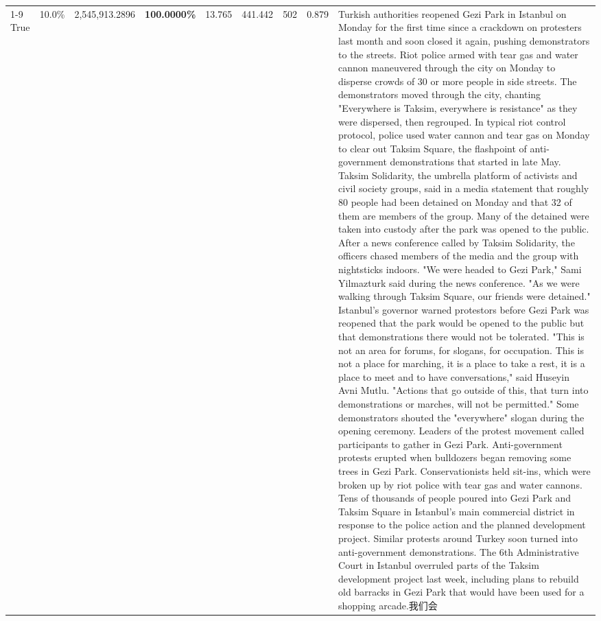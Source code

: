 \begin{table}[H]
\begin{tabular}{lllrlllll}
\cline{1-9}
True & 10.0\% & 2,545,913.2896 & \bfseries \color{red} 100.0000\% & 13.765 & 441.442 & 502 & 0.879 & Turkish authorities reopened Gezi Park in Istanbul on Monday for the first time since a crackdown on protesters last month and soon closed it again, pushing demonstrators to the streets. Riot police armed with tear gas and water cannon maneuvered through the city on Monday to disperse crowds of 30 or more people in side streets. The demonstrators moved through the city, chanting "Everywhere is Taksim, everywhere is resistance" as they were dispersed, then regrouped. In typical riot control protocol, police used water cannon and tear gas on Monday to clear out Taksim Square, the flashpoint of anti-government demonstrations that started in late May. Taksim Solidarity, the umbrella platform of activists and civil society groups, said in a media statement that roughly 80 people had been detained on Monday and that 32 of them are members of the group. Many of the detained were taken into custody after the park was opened to the public. After a news conference called by Taksim Solidarity, the officers chased members of the media and the group with nightsticks indoors. "We were headed to Gezi Park," Sami Yilmazturk said during the news conference. "As we were walking through Taksim Square, our friends were detained." Istanbul's governor warned protestors before Gezi Park was reopened that the park would be opened to the public but that demonstrations there would not be tolerated. "This is not an area for forums, for slogans, for occupation. This is not a place for marching, it is a place to take a rest, it is a place to meet and to have conversations," said Huseyin Avni Mutlu. "Actions that go outside of this, that turn into demonstrations or marches, will not be permitted." Some demonstrators shouted the "everywhere" slogan during the opening ceremony. Leaders of the protest movement called participants to gather in Gezi Park. Anti-government protests erupted when bulldozers began removing some trees in Gezi Park. Conservationists held sit-ins, which were broken up by riot police with tear gas and water cannons. Tens of thousands of people poured into Gezi Park and Taksim Square in Istanbul's main commercial district in response to the police action and the planned development project. Similar protests around Turkey soon turned into anti-government demonstrations. The 6th Administrative Court in Istanbul overruled parts of the Taksim development project last week, including plans to rebuild old barracks in Gezi Park that would have been used for a shopping arcade.我们会 \\

\end{tabular}
\end{table}
